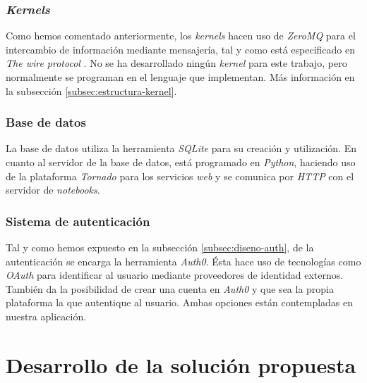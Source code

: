 \documentclass[11pt,spanish,listoffigures,listoftables]{tfgetsinf}
\begin{document}
\subsection{\textit{Kernels}}
\label{subsec:tecno-kernels}

Como hemos comentado anteriormente, los \textit{kernels} hacen uso de \textit{ZeroMQ} para el intercambio de información mediante mensajería, tal y como está especificado en \textit{The wire protocol} \cite{wire-protocol}. No se ha desarrollado ningún \textit{kernel} para este trabajo, pero normalmente se programan en el lenguaje que implementan. Más información en la subsección \ref{subsec:estructura-kernel}.


\subsection{Base de datos}
\label{subsec:tecno-DB}

La base de datos utiliza la herramienta \textit{SQLite} para su creación y utilización. En cuanto al servidor de la base de datos, está programado en \textit{Python}, haciendo uso de la plataforma \textit{Tornado} para los servicios \textit{web} y se comunica por \textit{HTTP} con el servidor de \textit{notebooks}.


\subsection{Sistema de autenticación}
\label{subsec:tecno-auth}

Tal y como hemos expuesto en la subsección \ref{subsec:diseno-auth}, de la autenticación se encarga la herramienta \textit{Auth0}. Ésta hace uso de tecnologías como \textit{OAuth} para identificar al usuario mediante proveedores de identidad externos. También da la posibilidad de crear una cuenta en \textit{Auth0} y que sea la propia plataforma la que autentique al usuario. Ambas opciones están contempladas en nuestra aplicación.





\chapter{Desarrollo de la solución propuesta}
\label{ch:desarrollo-solucion}
\end{document}
